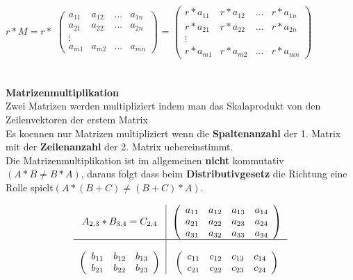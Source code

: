 \documentclass[a4paper]{article} %
\begin{document}
		$r * M = r * $ 	
		$
		\begin{pmatrix}
		a_{11} & a_{12} & ... 	& a_{1n}\\
		a_{21} & a_{22} & ...	& a_{2n}\\
		\vdots &        &	    &\\
		a_{m1} & a_{m2} & ...	& a_{mn}
		\end{pmatrix}
		$
		=
		$
		\begin{pmatrix}
		r*a_{11} & r*a_{12} & ... 	& r*a_{1n}\\
		r*a_{21} & r*a_{22} & ...	& r*a_{2n}\\
		\vdots &        &	    &\\
		r*a_{m1} & r*a_{m2} & ...	& r*a_{mn}
		\end{pmatrix}
		$
		\\\\\\
		\textbf{Matrizenmultiplikation}\\
		Zwei Matrizen werden multipliziert indem man das Skalaprodukt von den Zeilenvektoren der erstem Matrix\\
		Es koennen nur Matrizen multipliziert wenn die \textbf{Spaltenanzahl} der 1. Matrix mit der \textbf{Zeilenanzahl} der 2. Matrix uebereinstimmt.\\
		Die Matrizenmultiplikation ist im allgemeinen\textbf{ nicht} kommutativ$(A*B\neq B*A)$, daraus folgt dass beim \textbf{Distributivgesetz} die Richtung eine Rolle spielt$(A*(B+C)\neq (B+C)*A)$.
	
		\begin{align*}
			\begin{tabular}{c|c}
		$A_{2,3}*B_{3,4} = C_{2,4}$  & 		
		$\left(\begin{array}{cccc}
			a_{11} 	&  a_{12}  &	a_{13} 	&	 a_{14}  \\ 
			a_{21}  &  a_{22}  &	a_{23} 	&	 a_{24}  \\
			a_{31}  &  a_{32}  &	a_{33}  &	 a_{34}  \\
		\end{array}\right)$ \\
		\hline \\
		$				 
		\left(\begin{array}{ccc}
		 b_{11} 	&  b_{12} &	b_{13}\\  
		 b_{21} 	&  b_{22} &	b_{23}\\
		\end{array}\right) 
		$ & 
		$\left(\begin{array}{cccc}
			c_{11} 	& c_{12} &	c_{13}	&	c_{14} \\ 
			c_{21} 	&  c_{22} &	c_{23}	&	 c_{24} \\
		\end{array}\right)$ \\
		\end{tabular}
		\end{align*}
	
\end{document}
